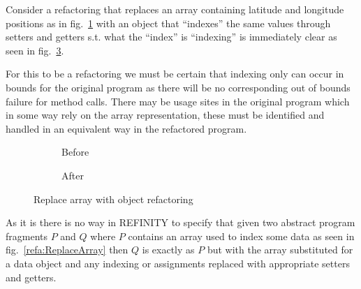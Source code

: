 Consider a refactoring that replaces an array containing latitude and longitude positions as in fig.~\ref{refa:ReplaceArray-before} with an object that ``indexes'' the same values through setters and getters s.t. what the ``index'' is ``indexing'' is immediately clear as seen in fig.~\ref{refa:ReplaceArray-after}.

For this to be a refactoring we must be certain that indexing only can occur in bounds for the original program as there will be no corresponding out of bounds failure for method calls. There may be usage sites in the original program which in some way rely on the array representation, these must be identified and handled in an equivalent way in the refactored program.

\begin{figure}
      \label{refa:ReplaceArray}
  \begin{subfigure}[h]{.45\linewidth}
    \label{refa:ReplaceArray-before}    
    
    \caption{Before}
  \end{subfigure}\hspace{1cm}
  \begin{subfigure}[h]{.45\linewidth}
    \label{refa:ReplaceArray-after}
    
    \caption{After}
  \end{subfigure}
  \caption{Replace array with object refactoring}
\end{figure}

As it is there is no way in REFINITY to specify that given two abstract program fragments $P$ and $Q$ where $P$ contains
an array used to index some data as seen in fig.~\ref{refa:ReplaceArray} then $Q$ is exactly as $P$ but with
the array substituted for a data object and any indexing or assignments replaced with appropriate setters
and getters. 
